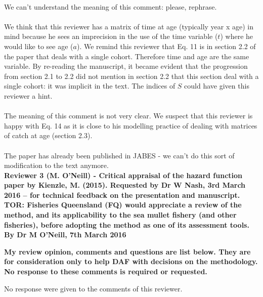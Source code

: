 \documentclass[11pt]{article}
\begin{document}
\begin{spacing}{1.2}
 \\
We can't understand the meaning of this comment: please, rephrase.\\

 \\
We think that this reviewer has a matrix of time at age (typically year x age) in mind because he sees an imprecision in the use of the time variable ($t$) where he would like to see age ($a$). We remind this reviewer that Eq. 11 is in section 2.2 of the paper that deals with a single cohort. Therefore time and age are the same variable. By re-reading the manuscript, it became evident that the progression from section 2.1 to 2.2 did not mention in section 2.2 that this section deal with a single cohort: it was implicit in the text. The indices of $S$ could have given this reviewer a hint. \\

\\
The meaning of this comment is not very clear. We suspect that this reviewer is happy with Eq. 14 as it is close to his modelling practice of dealing with matrices of catch at age (section 2.3). \\

 \\
The paper has already been published in JABES - we can't do this sort of modification to the text anymore. \\

{\bf Reviewer 3 (M. O'Neill) - Critical appraisal of the hazard function paper by Kienzle, M. (2015). Requested by Dr W Nash, 3rd March 2016 – for technical feedback on the presentation and manuscript. TOR: Fisheries Queensland (FQ) would appreciate a review of the method, and its applicability to the sea mullet fishery (and other fisheries), before adopting the method as one of its assessment tools. By Dr M O’Neill, 7th March 2016}

{\bf My review opinion, comments and questions are list below. They are for consideration only to help DAF with decisions on the methodology. No response to these comments is required or requested.}

No response were given to the comments of this reviewer. \\


\end{spacing}
\end{document}
